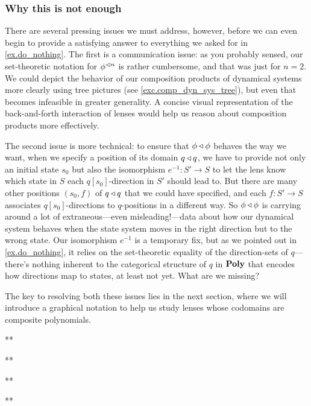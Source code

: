 \documentclass[Book-Poly]{subfiles}
\begin{document}
\subsubsection{Why this is not enough}
There are several pressing issues we must address, however, before we can even begin to provide a satisfying answer to everything we asked for in \cref{ex.do_nothing}.
The first is a communication issue: as you probably sensed, our set-theoretic notation for $\phi^{\lhd n}$ is rather cumbersome, and that was just for $n=2$.
We could depict the behavior of our composition products of dynamical systems more clearly using tree pictures (see \cref{exc.comp_dyn_sys_tree}), but even that becomes infeasible in greater generality.
A concise visual representation of the back-and-forth interaction of lenses would help us reason about composition products more effectively.

The second issue is more technical: to ensure that $\phi\mathbin{\triangleleft}\phi$ behaves the way we want, when we specify a position of its domain $q\mathbin{\triangleleft} q$, we have to provide not only an initial state $s_0$ but also the isomorphism $e^{-1}\colon S'\to S$ to let the lens know which state in $S$ each $q[s_0]$-direction in $S'$ should lead to.
But there are many other positions $(s_0,f)$ of $q\mathbin{\triangleleft} q$ that we could have specified, and each $f\colon S'\to S$ associates $q[s_0]$-directions to $q$-positions in a different way.
So $\phi\mathbin{\triangleleft}\phi$ is carrying around a lot of extraneous---even misleading!---data about how our dynamical system behaves when the state system moves in the right direction but to the wrong state.
Our isomorphism $e^{-1}$ is a temporary fix, but as we pointed out in \cref{ex.do_nothing}, it relies on the set-theoretic equality of the direction-sets of $q$---there's nothing inherent to the categorical structure of $q$ in $\mathbf{Poly}$ that encodes how directions map to states, at least not yet.
What are we missing?

The key to resolving both these issues lies in the next section, where we will introduce a graphical notation to help us study lenses whose codomains are composite polynomials.

\begin{exercise} \label{exc.comp_dyn_sys_tree}
** %
\begin{solution}
**
\end{solution}
\end{exercise}


\begin{exercise} \label{exc.comp_interface}
** %
\begin{solution}
**
\end{solution}
\end{exercise}
\end{document}
